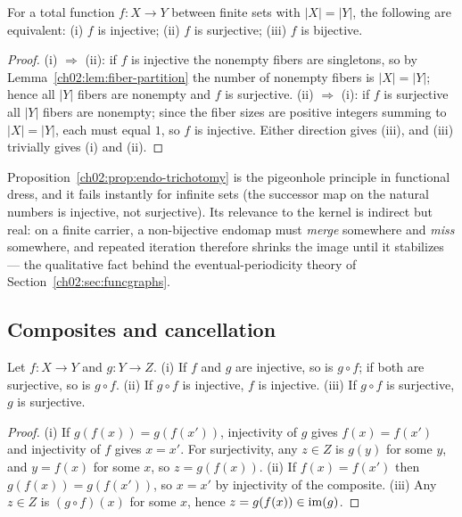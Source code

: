 \begin{proposition}\label{ch02:prop:endo-trichotomy}
For a total function $f : X \to Y$ between finite sets with $|X| = |Y|$,
the following are equivalent: (i) $f$ is injective; (ii) $f$ is surjective;
(iii) $f$ is bijective.
\end{proposition}

\begin{proof}
(i) $\Rightarrow$ (ii): if $f$ is injective the nonempty fibers are
singletons, so by Lemma~\ref{ch02:lem:fiber-partition} the number of
nonempty fibers is $|X| = |Y|$; hence all $|Y|$ fibers are nonempty and $f$
is surjective. (ii) $\Rightarrow$ (i): if $f$ is surjective all $|Y|$
fibers are nonempty; since the fiber sizes are positive integers summing to
$|X| = |Y|$, each must equal $1$, so $f$ is injective. Either direction
gives (iii), and (iii) trivially gives (i) and (ii).
\end{proof}

\begin{remark}\label{ch02:rem:pigeonhole}
Proposition~\ref{ch02:prop:endo-trichotomy} is the pigeonhole principle in
functional dress, and it fails instantly for infinite sets (the successor
map on the natural numbers is injective, not surjective). Its relevance to
the kernel is indirect but real: on a finite carrier, a non-bijective
endomap must \emph{merge} somewhere and \emph{miss} somewhere, and repeated
iteration therefore shrinks the image until it stabilizes --- the
qualitative fact behind the eventual-periodicity theory of
Section~\ref{ch02:sec:funcgraphs}.
\end{remark}

\subsection{Composites and cancellation}

\begin{proposition}\label{ch02:prop:comp-inj-surj}
Let $f : X \to Y$ and $g : Y \to Z$. (i) If $f$ and $g$ are injective, so is
$g \circ f$; if both are surjective, so is $g \circ f$. (ii) If
$g \circ f$ is injective, $f$ is injective. (iii) If $g \circ f$ is
surjective, $g$ is surjective.
\end{proposition}

\begin{proof}
(i) If $g(f(x)) = g(f(x'))$, injectivity of $g$ gives $f(x) = f(x')$ and
injectivity of $f$ gives $x = x'$. For surjectivity, any $z \in Z$ is
$g(y)$ for some $y$, and $y = f(x)$ for some $x$, so $z = g(f(x))$.
(ii) If $f(x) = f(x')$ then $g(f(x)) = g(f(x'))$, so $x = x'$ by
injectivity of the composite. (iii) Any $z \in Z$ is $(g \circ f)(x)$ for
some $x$, hence $z = g(f(x)) \in \mathrm{im}(g)$.
\end{proof}

